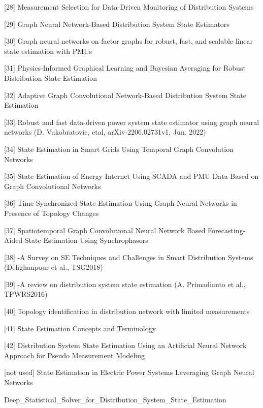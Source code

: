 \documentclass[journal]{IEEEtran}  %
\begin{document}
[28]
Measurement Selection for Data-Driven Monitoring
of Distribution Systems

[29]
Graph Neural Network-Based Distribution
System State Estimators

[30]
Graph neural networks on factor graphs for robust, fast, and scalable
linear state estimation with PMUs

[31]
Physics-Informed Graphical Learning and Bayesian
Averaging for Robust Distribution State Estimation

[32]
Adaptive Graph Convolutional Network-Based
Distribution System State Estimation

[33]
Robust and fast data-driven power system state estimator using graph neural networks (D. Vukobratovic, etal, arXiv-2206.02731v1, Jun. 2022)

[34]
State Estimation in Smart Grids Using Temporal Graph Convolution Networks

[35]
State Estimation of Energy Internet Using SCADA and PMU Data Based on Graph Convolutional Networks

[36]
Time-Synchronized State Estimation Using Graph Neural Networks in Presence of Topology Changes

[37]
Spatiotemporal Graph Convolutional Neural Network Based Forecasting-Aided State Estimation Using Synchrophasors

[38]
-A Survey on SE Techniques and Challenges in Smart Distribution Systems (Dehghanpour et al., TSG2018)

[39]
-A review on distribution system state estimation (A. Primadianto et al., TPWRS2016)

[40]
Topology identification in distribution network with limited measurements

[41]
State Estimation Concepts and Terminology

[42]
Distribution System State Estimation Using an Artificial Neural Network Approach for Pseudo Measurement Modeling

[not used]
State Estimation in Electric Power Systems Leveraging Graph Neural Networks



Deep_Statistical_Solver_for_Distribution_System_State_Estimation
\end{document}
